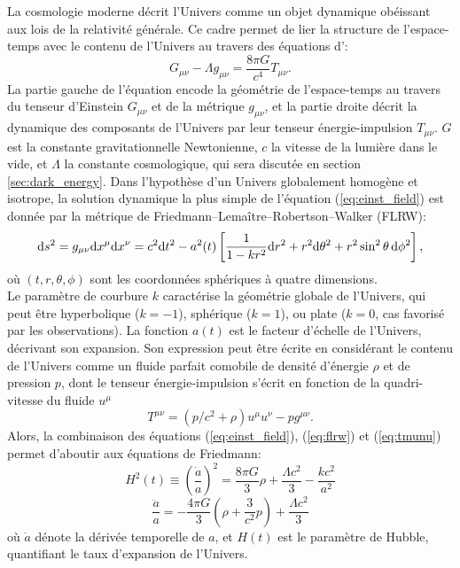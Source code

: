 La cosmologie moderne décrit l'Univers comme un objet dynamique obéissant aux lois de la relativité générale.
Ce cadre permet de lier la structure de l'espace-temps avec le contenu de l'Univers au travers des équations d':
\begin{equation}
    \label{eq:einst_field}
    G_{\mu\nu} - \Lambda g_{\mu\nu} = \frac{8\pi G}{c^4} T_{\mu\nu}.
\end{equation}
La partie gauche de l'équation encode la géométrie de l'espace-temps au travers du tenseur d'Einstein $G_{\mu\nu}$ et de la métrique $g_{\mu\nu}$, et la partie droite décrit la dynamique des composants de l'Univers par leur tenseur énergie-impulsion $T_{\mu\nu}$.
$G$ est la constante gravitationnelle Newtonienne, $c$ la vitesse de la lumière dans le vide, et $\Lambda$ la constante cosmologique, qui sera discutée en section \ref{sec:dark_energy}.
Dans l'hypothèse d'un Univers globalement homogène et isotrope, la solution dynamique la plus simple de l'équation (\ref{eq:einst_field}) est donnée par la métrique de Friedmann–Lemaître–Robertson–Walker (FLRW):
\begin{equation}
    \label{eq:flrw}
    \mathrm{d} s^2 = g_{\mu\nu} \mathrm{d} x^\mu \mathrm{d} x^\nu = c^2 \mathrm{d} t^2 - a^2(t) \left[ \frac{1}{1 - kr^2} \mathrm{d} r^2 + r^2 \mathrm{d}\theta^2 + r^2 \sin^2\theta \, \mathrm{d}\phi^2 \right],
\end{equation}
où $(t, r, \theta, \phi)$ sont les coordonnées sphériques à quatre dimensions. \\
Le paramètre de courbure $k$ caractérise la géométrie globale de l'Univers, qui peut être hyperbolique ($k=-1$), sphérique ($k=1$), ou plate ($k=0$, cas favorisé par les observations).
La fonction $a(t)$ est le facteur d'échelle de l'Univers, décrivant son expansion.
Son expression peut être écrite en considérant le contenu de l'Univers comme un fluide parfait comobile de densité d'énergie $\rho$ et de pression $p$, dont le tenseur énergie-impulsion s'écrit en fonction de la quadri-vitesse du fluide $u^\mu$
\begin{equation}
    \label{eq:tmunu}
    T^{\mu\nu} = (p/c^2 + \rho)u^\mu u^\nu - p g^{\mu\nu}.
\end{equation}
Alors, la combinaison des équations (\ref{eq:einst_field}), (\ref{eq:flrw}) et (\ref{eq:tmunu}) permet d'aboutir aux équations de Friedmann:
\begin{equation}
    \label{eq:fried1}
    H^2(t) \equiv \left(\frac{\dot{a}}{a}\right)^2 = \frac{8\pi G}{3} \rho + \frac{\Lambda c^2}{3} - \frac{kc^2}{a^2}
\end{equation}
\begin{equation}
    \label{eq:fried2}
    \frac{\ddot{a}}{a} = -\frac{4\pi G}{3} \left(\rho + \frac{3}{c^2} p\right) + \frac{\Lambda c^2}{3}
\end{equation}
où $\dot{a}$ dénote la dérivée temporelle de $a$, et $H(t)$ est le paramètre de Hubble, quantifiant le taux d'expansion de l'Univers.

